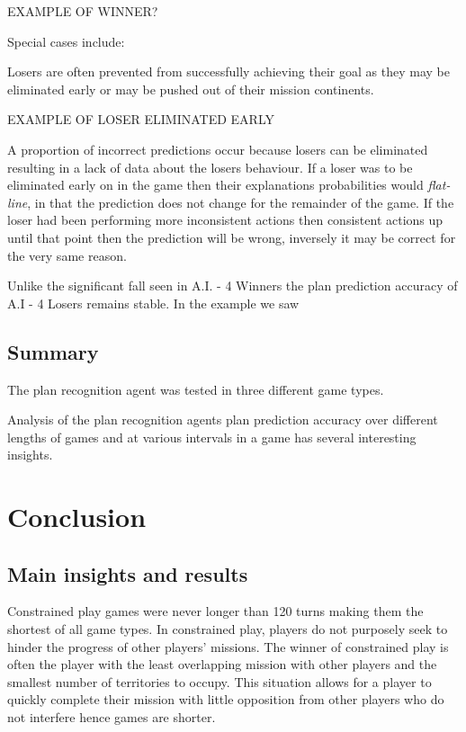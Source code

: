 \documentclass[parskip]{cs4rep}
\begin{document}
EXAMPLE OF WINNER?

Special cases include:

Losers are often prevented from successfully achieving their goal as they may be eliminated early or may be pushed out of their mission continents.

EXAMPLE OF LOSER ELIMINATED EARLY

A proportion of incorrect predictions occur because losers can be eliminated resulting in a lack of data about the losers behaviour. If a loser was to be eliminated early on in the game then their explanations probabilities would \textit{flat-line}, in that the prediction does not change for the remainder of the game. If the loser had been performing more inconsistent actions then consistent actions up until that point then the prediction will be wrong, inversely it may be correct for the very same reason.

Unlike the significant fall seen in A.I. -  4 Winners the plan prediction accuracy of A.I - 4 Losers remains stable. In the example we saw

\section{Summary}

The plan recognition agent was tested in three different game types.

Analysis of the plan recognition agents plan prediction accuracy over different lengths of games and at various intervals in a game has several interesting insights.

\chapter{Conclusion}

\section{Main insights and results}

Constrained play games were never longer than 120 turns making them the shortest of all game types.
In constrained play, players do not purposely seek to hinder the progress of other players' missions. The winner of constrained play is often the player with the least overlapping mission with other players and the smallest number of territories to occupy. This situation allows for a player to quickly complete their mission with little opposition from other players who do not interfere hence games are shorter.
\end{document}
